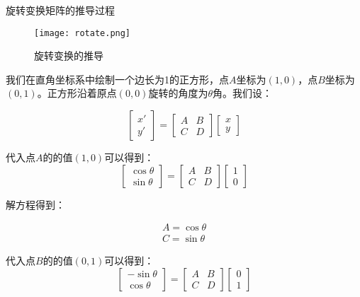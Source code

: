 \documentclass[openany]{progbookcn}
\begin{document}
\begin{titledbox}{旋转变换矩阵的推导过程}
	\begin{figure}[H]
		\centering
		\texttt{[image: rotate.png]}
		\caption{旋转变换的推导}
		\label{fig:shear}
	\end{figure}

我们在直角坐标系中绘制一个边长为1的正方形，点$A$坐标为$(1,0)$，点$B$坐标为$(0,1)$。正方形沿着原点$(0,0)$旋转的角度为$\theta$角。我们设：

\begin{equation}
	\begin{bmatrix}x'\\y'\end{bmatrix}=\begin{bmatrix}A&B\\C&D\end{bmatrix}\begin{bmatrix}x\\y\end{bmatrix}
\end{equation}

代入点$A$的的值$(1,0)$可以得到：
\begin{equation}
	\begin{bmatrix}\cos\theta\\\sin\theta\end{bmatrix}=\begin{bmatrix}A&B\\C&D\end{bmatrix}\begin{bmatrix}1\\0\end{bmatrix}
\end{equation}

解方程得到：

\begin{equation}
\begin{split}
	A=\cos\theta\\C=\sin\theta
\end{split}
\end{equation}

代入点$B$的的值$(0,1)$可以得到：
\begin{equation}
	\begin{bmatrix}-\sin\theta\\\cos\theta\end{bmatrix}=\begin{bmatrix}A&B\\C&D\end{bmatrix}\begin{bmatrix}0\\1\end{bmatrix}
\end{equation}


\end{titledbox}
\end{document}
